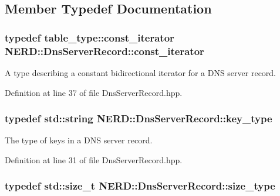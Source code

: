 \subsection{\-Member \-Typedef \-Documentation}
\hypertarget{classNERD_1_1DnsServerRecord_a870208456774471b644a9715f88d4ea6}{
\subsubsection[{const\-\_\-iterator}]{\setlength{\rightskip}{0pt plus 5cm}typedef table\-\_\-type\-::const\-\_\-iterator {\bf \-N\-E\-R\-D\-::\-Dns\-Server\-Record\-::const\-\_\-iterator}}}
\label{classNERD_1_1DnsServerRecord_a870208456774471b644a9715f88d4ea6}


\-A type describing a constant bidirectional iterator for a \-D\-N\-S server record. 



\-Definition at line 37 of file \-Dns\-Server\-Record.\-hpp.

\hypertarget{classNERD_1_1DnsServerRecord_ae4822fbc6f9564c337a67c40358e2810}{
\subsubsection[{key\-\_\-type}]{\setlength{\rightskip}{0pt plus 5cm}typedef std\-::string {\bf \-N\-E\-R\-D\-::\-Dns\-Server\-Record\-::key\-\_\-type}}}
\label{classNERD_1_1DnsServerRecord_ae4822fbc6f9564c337a67c40358e2810}


\-The type of keys in a \-D\-N\-S server record. 



\-Definition at line 31 of file \-Dns\-Server\-Record.\-hpp.

\hypertarget{classNERD_1_1DnsServerRecord_a51602195a3768bfdac0b69fb76358167}{
\subsubsection[{size\-\_\-type}]{\setlength{\rightskip}{0pt plus 5cm}typedef std\-::size\-\_\-t {\bf \-N\-E\-R\-D\-::\-Dns\-Server\-Record\-::size\-\_\-type}}}
\label{classNERD_1_1DnsServerRecord_a51602195a3768bfdac0b69fb76358167}


